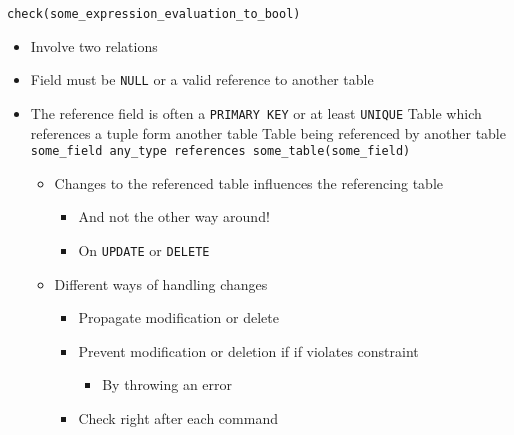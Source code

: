 \begin{itemize}
\begin{itemize}
             \verb+check(some_expression_evaluation_to_bool)+
        \end{itemize}
        \begin{itemize}
            \item Involve two relations
            \item Field must be \verb+NULL+ or a valid reference to another table
            \item The reference field is often a \verb+PRIMARY KEY+ or at least \verb+UNIQUE+
             Table which references a tuple form another table
             Table being referenced by another table
             \verb+some_field any_type references some_table(some_field)+
                \begin{itemize}
                    \item Changes to the referenced table influences the referencing table
                        \begin{itemize}
                            \item And not the other way around!
                            \item On \verb+UPDATE+ or \verb+DELETE+
                        \end{itemize}
                    \item Different ways of handling changes
                        \begin{itemize}
                            \item Propagate modification or delete
                        \end{itemize}
                        \begin{itemize}
                            \item Prevent modification or deletion if if violates constraint
                                \begin{itemize}
                                    \item By throwing an error
                                \end{itemize}
                            \item Check right after each command
                        \end{itemize}
                        \begin{itemize}

\end{itemize}
\end{itemize}
\end{itemize}
\end{itemize}
